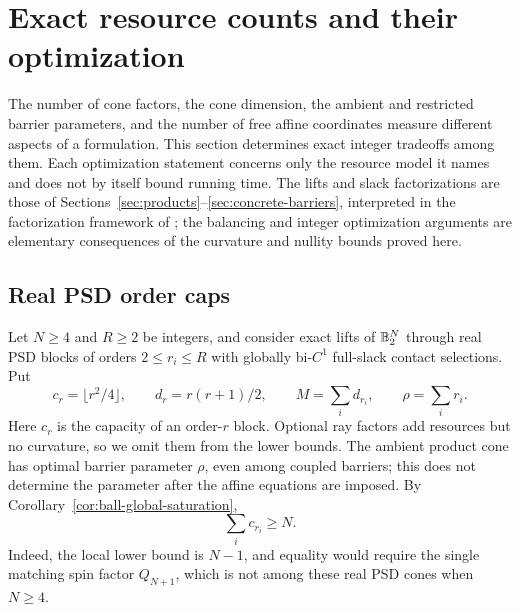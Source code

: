 \section{Exact resource counts and their optimization}\label{res:section}

The number of cone factors, the cone dimension, the ambient and
restricted barrier parameters, and the number of free affine coordinates
measure different aspects of a formulation. This section determines exact
integer tradeoffs among them. Each optimization statement concerns only
the resource model it names and does not by itself bound running time.
The lifts and slack factorizations are those of
Sections~\ref{sec:products}--\ref{sec:concrete-barriers}, interpreted in
the factorization framework of \citet{GPT2013}; the balancing and integer
optimization arguments are elementary consequences of the curvature and
nullity bounds proved here.

\subsection{Real PSD order caps}
Let $N\geq4$ and $R\geq2$ be integers, and consider exact lifts of
$\mathbb B_2^N$ through real PSD blocks of orders $2\leq r_i\leq R$ with globally
bi-$C^1$ full-slack contact selections. Put
\[
 c_r=\lfloor r^2/4\rfloor,\qquad d_r=r(r+1)/2,\qquad
 M=\sum_i d_{r_i},\qquad \rho=\sum_i r_i.
\]
Here $c_r$ is the capacity of an order-$r$ block. Optional ray factors
add resources but no curvature, so we omit them from the lower bounds.
The ambient product cone has optimal barrier parameter $\rho$, even among
coupled barriers; this does not determine the parameter after the affine
equations are imposed.
By Corollary~\ref{cor:ball-global-saturation},
\begin{equation}\label{res:capacity}
 \sum_i c_{r_i}\geq N.
\end{equation}
Indeed, the local lower bound is $N-1$, and equality would require the
single matching spin factor $Q_{N+1}$, which is not among these real PSD
cones when $N\geq4$.


